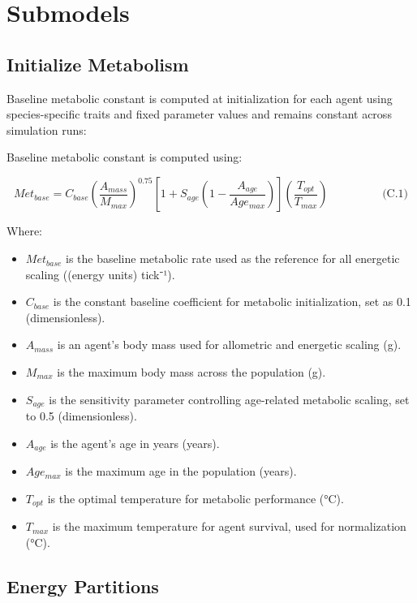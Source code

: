 \documentclass[
]{book}
\begin{document}
\section{Submodels}\label{submodels}

\subsection{Initialize Metabolism}\label{initialize-metabolism}

Baseline metabolic constant is computed at initialization for each agent
using species-specific traits and fixed parameter values and remains
constant across simulation runs:

Baseline metabolic constant is computed using:

\[
\begin{equation} Met_{base} = C_{base} \left(\frac{A_{mass}}{M_{max}}\right)^{0.75} \left[1 + S_{age}\left(1 - \frac{A_{age}}{Age_{max}}\right)\right] \left(\frac{T_{opt}}{T_{max}}\right) \hspace{2cm} \text{(C.1)} \end{equation}
\]

Where:

\begin{itemize}
\item
  \(Met_{base}\) is the baseline metabolic rate used as the reference
  for all energetic scaling ((energy units) tick⁻¹).
\item
  \(C_{base}\) is the constant baseline coefficient for metabolic
  initialization, set as 0.1 (dimensionless).
\item
  \(A_{mass}\) is an agent's body mass used for allometric and energetic
  scaling (g).
\item
  \(M_{max}\) is the maximum body mass across the population (g).
\item
  \(S_{age}\) is the sensitivity parameter controlling age-related
  metabolic scaling, set to 0.5 (dimensionless).
\item
  \(A_{age}\) is the agent's age in years (years).
\item
  \(Age_{max}\) is the maximum age in the population (years).
\item
  \(T_{opt}\) is the optimal temperature for metabolic performance (°C).
\item
  \(T_{max}\) is the maximum temperature for agent survival, used for
  normalization (°C).
\end{itemize}

\subsection{Energy Partitions}\label{energy-partitions}
\end{document}
